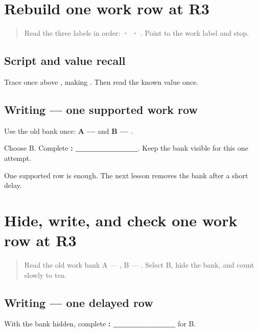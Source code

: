 \section[\texorpdfstring{\pa{ਕੰਮ}: \pa{ਨੌਕਰੀ} (work field …)}{ਕੰਮ: ਨੌਕਰੀ (work field …)}]{Rebuild one work row at R3}

\label{lesson:PA-R26-work-build-r3}



\begin{quote}
Read the three labels in order: \textbf{ ·  · }. Point to the work label and stop.
\end{quote}

\subsection*{Script and value recall}
Trace \textbf{} once above \textbf{}, making \textbf{}. Then read the known value \textbf{} once.

\subsection*{Writing — one supported work row}
Use the old bank once: \textbf{A — } and \textbf{B — }.

Choose B. Complete \textbf{: \_\_\_\_\_\_\_\_\_\_}. Keep the bank visible for this one attempt.

\begin{tcolorbox}[breakable,colback=teal!4,colframe=teal!35!black,title={Before you move on}]
One supported row is enough. The next lesson removes the bank after a short delay.
\end{tcolorbox}
\section[\texorpdfstring{\pa{ਕੰਮ}: \pa{ਨੌਕਰੀ} (work field …)}{ਕੰਮ: ਨੌਕਰੀ (work field …)}]{Hide, write, and check one work row at R3}

\label{lesson:PA-R26-work-control-r3}



\begin{quote}
Read the old work bank A — \textbf{}, B — \textbf{}. Select B, hide the bank, and count slowly to ten.
\end{quote}

\subsection*{Writing — one delayed row}
With the bank hidden, complete \textbf{: \_\_\_\_\_\_\_\_\_\_} for B.

